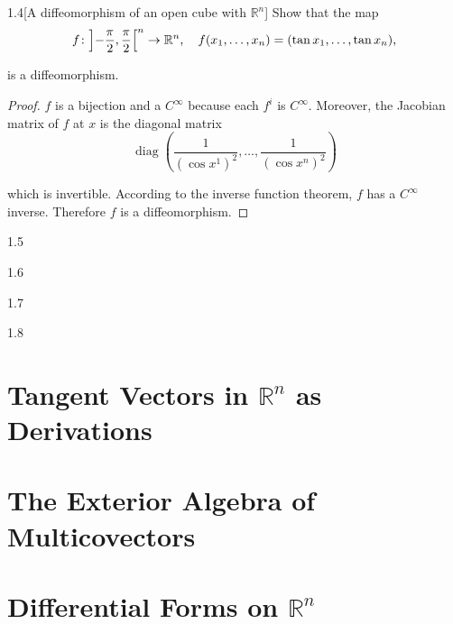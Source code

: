 \begin{problem}{1.4}[A diffeomorphism of an open cube with \(\mathbb{R}^{n}\)]
Show that the map
\[
	f\colon{\left]{-\frac{\pi}{2},\frac{\pi}{2}}\right[}^{n}\to\mathbb{R}^{n}, \quad f(x_{1},\ldots,x_{n})=(\tan x_{1},\ldots,\tan x_{n}),
\]

is a diffeomorphism.
\end{problem}

\begin{proof}
	\( f \) is a bijection and a \( C^{\infty} \) because each \( f^{i} \) is \( C^{\infty} \). Moreover, the Jacobian matrix of \( f \) at \( x \) is the diagonal matrix
	\[
		\operatorname{diag}\left(\frac{1}{{(\cos x^{1})}^{2}}, \ldots, \frac{1}{{(\cos x^{n})}^{2}}\right)
	\]

	which is invertible. According to the inverse function theorem, \( f \) has a \( C^{\infty} \) inverse. Therefore \( f \) is a diffeomorphism.
\end{proof}

\begin{problem}{1.5}
\end{problem}

\begin{problem}{1.6}
\end{problem}

\begin{problem}{1.7}
\end{problem}

\begin{problem}{1.8}
\end{problem}

\section{Tangent Vectors in \( \mathbb{R}^{n} \) as Derivations}

\section{The Exterior Algebra of Multicovectors}

\section{Differential Forms on \( \mathbb{R}^{n} \)}

